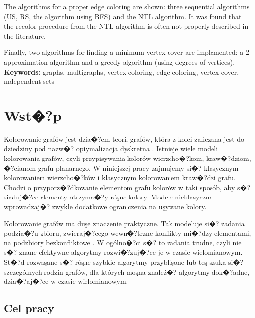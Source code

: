 \documentclass[12pt,a4paper]{mwrep}
\begin{document}
The algorithms for a proper edge coloring are shown:
three sequential algorithms (US, RS, the algorithm using BFS) 
and the NTL algorithm.
It was found that the recolor procedure from the NTL algorithm
is often not properly described in the literature.

Finally, two algorithms for finding a minimum vertex cover are implemented:
a 2-approximation algorithm and a greedy algorithm
(using degrees of vertices).
\newline
\newline
\textbf{Keywords:} graphs, multigraphs, vertex coloring, edge coloring,
vertex cover, independent sets



\tableofcontents

\listoftables

\listoffigures

\lstlistoflistings
{}


\chapter{Wst�?p}
\label{ch:wstep}

Kolorowanie grafów jest dzia�?em teorii grafów, która z kolei
zaliczana jest do dziedziny pod nazw�? optymalizacja dyskretna
\cite{Kubale}.
Istnieje wiele modeli kolorowania grafów, czyli przypisywania
kolorów wierzcho�?kom, kraw�?dziom, �?cianom grafu planarnego.
W niniejszej pracy zajmujemy si�? klasycznym kolorowaniem
wierzcho�?ków i klasycznym kolorowaniem kraw�?dzi grafu.
Chodzi o przyporz�?dkowanie elementom grafu kolorów w taki sposób,
aby s�?siaduj�?ce elementy otrzyma�?y róşne kolory.
Modele nieklasyczne wprowadzaj�? zwykle dodatkowe ograniczenia 
na uşywane kolory.

Kolorowanie grafów ma duşe znaczenie praktyczne.
Tak modeluje si�? zadania podzia�?u zbioru, zwieraj�?cego wewn�?trzne 
konflikty mi�?dzy elementami, na podzbiory bezkonfliktowe
\cite{Kubale}. W ogólno�?ci s�? to zadania trudne, czyli nie s�?
znane efektywne algorytmy rozwi�?zuj�?ce je w czasie wielomianowym.
St�?d rozwaşane s�? róşne szybkie algorytmy przyblişone
lub teş szuka si�? szczególnych rodzin grafów, dla których
moşna znaleź�? algorytmy dok�?adne, dzia�?aj�?ce w czasie wielomianowym.

\section{Cel pracy}
\end{document}
